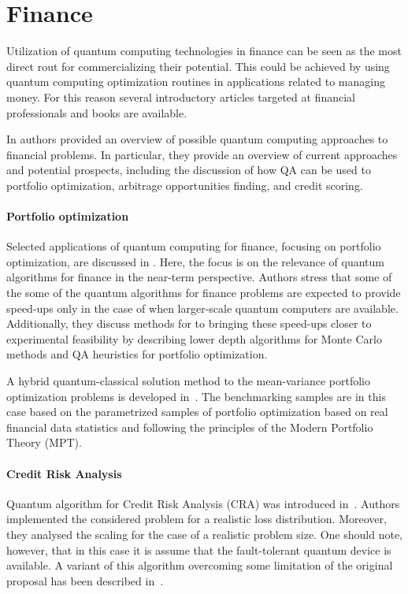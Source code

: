 \documentclass[a4paper,11pt]{article}
\begin{document}
\section{Finance}


Utilization of quantum computing technologies in finance can be seen as the most direct rout for commercializing their potential. This could be achieved by using quantum computing optimization routines in applications related to managing money. For this reason several introductory articles targeted at financial professionals and books are available.

In \cite{orus2019quantum} authors provided an overview of possible quantum computing approaches to financial problems. In particular, they provide an overview of current approaches and potential prospects, including the discussion of how QA can be used to portfolio optimization, arbitrage opportunities finding, and credit scoring.

\paragraph{Portfolio optimization}
Selected applications of quantum computing for finance, focusing on portfolio optimization, are discussed in \cite{bouland2020prospects}. Here, the focus is on  the relevance of quantum algorithms for finance in the near-term perspective. Authors stress that some of the some of the quantum algorithms for finance problems are expected to provide speed-ups only in the case of when larger-scale quantum computers are available. Additionally, they discuss methods for to bringing these speed-ups closer to experimental feasibility by describing lower depth algorithms for Monte Carlo methods and QA heuristics for portfolio optimization.

A hybrid quantum-classical solution method to the mean-variance portfolio optimization problems is developed in~\cite{venturelli2019reverse}. The benchmarking samples are in this case based on the parametrized samples of portfolio optimization based on real financial data statistics and following the principles of the Modern Portfolio Theory (MPT).

\paragraph{Credit Risk Analysis}
Quantum algorithm for Credit Risk Analysis (CRA) was introduced in~\cite{egger2021credit}. Authors implemented the considered problem for a realistic loss distribution. Moreover, they analysed the scaling  for the case of a realistic problem size. One should note, however, that in this case it is assume that the fault-tolerant quantum device is available. A variant of this algorithm overcoming some limitation of the original proposal has been described in~\cite{dri2022towards,dri2023more}.
\end{document}
